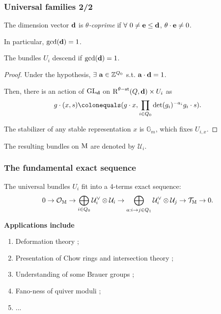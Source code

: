 \documentclass{beamer}
\begin{document}
\begin{frame}
    \frametitle{Universal families 2/2}
\begin{definition}
The dimension vector $\mathbf{d}$ is \emph{$\theta$-coprime} if
$\forall~ 0 \neq \mathbf{e} \leq \mathbf{d}$, $\theta \cdot \mathbf{e} \neq 0$.
\end{definition} \pause
In particular, $\gcd(\mathbf{d}) = 1$. \pause

\begin{lemma}
    The bundles $U_i$ descend if $\gcd(\mathbf{d}) = 1$.
\end{lemma}\pause
\begin{proof}
Under the hypothesis, $\exists~\mathbf{a} \in \mathbb{Z}^{Q_0}$
s.t. $\mathbf{a} \cdot \mathbf{d} = 1$. \pause

Then, there is an action of $\operatorname{\operatorname{GL}_{\mathbf{d}}}$ on
$\operatorname{R}^{\theta-\mathrm{st}}(Q, \mathbf{d}) \times U_i$ as
\[g \cdot (x, s) \colonequals (g \cdot x, \prod_{i \in Q_0} \det(g_i)^{-a_i} g_i \cdot s). \] \pause

The stabilizer of any stable representation $x$ is $\mathbb{G}_m$, which fixes $U_{i, x}$.
\end{proof} \pause

The resulting bundles on $\operatorname{M}$ are denoted by $\mathcal{U}_i$.

\end{frame}
\begin{frame}
    \frametitle{The fundamental exact sequence}
The universal bundles $U_i$ fit into a 4-terms exact sequence: \pause
\begin{equation}
\label{equation:4-term-exact-sequence}
0
\overset{}{\rightarrow}\mathcal{O}_{\operatorname{M}}
\overset{}{\rightarrow}\bigoplus_{i \in Q_0} \mathcal{U}^\vee_i \otimes \mathcal{U}_i
\overset{}{\rightarrow}\bigoplus_{a: i \overset{}{\rightarrow} j \in Q_1} \mathcal{U}^\vee_{i} \otimes \mathcal{U}_{j}
\overset{}{\rightarrow}\mathcal{T}_{\operatorname{M}}
\overset{}{\rightarrow} 0.
\end{equation} \pause

{\bf Applications include}
\begin{enumerate}
    \item Deformation theory \cite{belmans2023rigidity};
    \item Presentation of Chow rings \cite{Franzen2015} and intersection theory \cite{belmans2023chow};
    \item Understanding of some Brauer groups \cite{reineke2014brauer};
    \item Fano-ness of quiver moduli \cite{Franzen2020};
    \item ...
\end{enumerate}
\end{frame}
\end{document}
